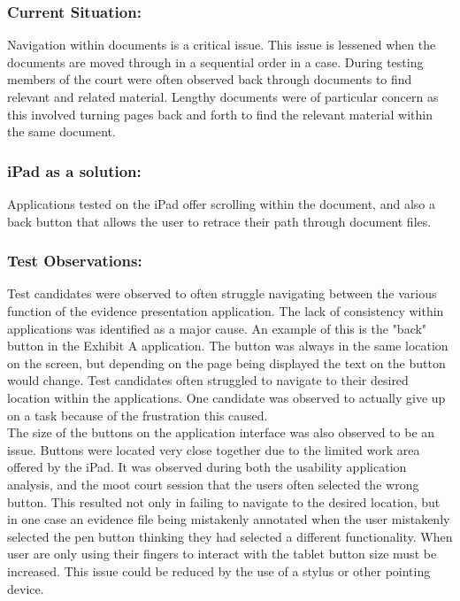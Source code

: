 \subsubsection{Current Situation:}
Navigation within documents is a critical issue. This issue is lessened when the documents are moved through in a sequential order in a case. During testing members of the court were often observed back through documents to find relevant and related material. Lengthy documents were of particular concern as this involved turning pages back and forth to find the relevant material within the same document.\\
\subsubsection{iPad as a solution:}
Applications tested on the iPad offer scrolling within the document, and also a back button that allows the user to retrace their path through document files.\\
\subsubsection{Test Observations:}
Test candidates were observed to often struggle navigating between the various function of the evidence presentation application. The lack of consistency within applications was identified as a major cause. An example of this is the "back" button in the Exhibit A application. The button was always in the same location on the screen, but depending on the page being displayed the text on the button would change. Test candidates often struggled to navigate to their desired location within the applications. One candidate was observed to actually give up on a task because of the frustration this caused. \\
The size of the buttons on the application interface was also observed to be an issue. Buttons were located very close together due to the limited work area offered by the iPad. It was observed during both the usability application analysis, and the moot court session that the users often selected the wrong button. This resulted not only in failing to navigate to the desired location, but in one case an evidence file being mistakenly annotated when the user mistakenly selected the pen button thinking they had selected a different functionality. When user are only using their fingers to interact with the tablet button size must be increased. This issue could be reduced by the use of a stylus or other pointing device.
